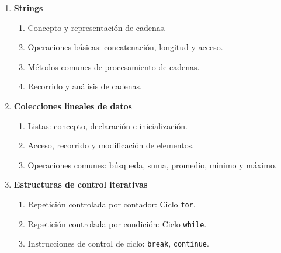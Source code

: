 \begin{enumerate}
  \begin{enumerate}
    \item \label{itm:4.1} Secuencia de instrucciones y bloques de código.
    \item \label{itm:4.2} Evaluación de condiciones lógicas.
    \item \label{itm:4.3} Estructura \texttt{if}.
    \item \label{itm:4.4} Estructura \texttt{if--else}.
    \item \label{itm:4.5} Estructura \texttt{if--elif--else}.
    \item \label{itm:4.6} Condicionales anidados.
  \end{enumerate}

  \item \textbf{Strings}

  \begin{enumerate}
    \item \label{itm:5.1} Concepto y representación de cadenas.
    \item \label{itm:5.2} Operaciones básicas: concatenación, longitud y acceso.
    \item \label{itm:5.3} Métodos comunes de procesamiento de cadenas.
    \item \label{itm:5.4} Recorrido y análisis de cadenas.
  \end{enumerate}

  \item \textbf{Colecciones lineales de datos}

  \begin{enumerate}
    \item \label{itm:6.1} Listas: concepto, declaración e inicialización.
    \item \label{itm:6.2} Acceso, recorrido y modificación de elementos.
    \item \label{itm:6.3} Operaciones comunes: búsqueda, suma, promedio, mínimo y máximo.
  \end{enumerate}

  \item \textbf{Estructuras de control iterativas}

  \begin{enumerate}
    \item \label{itm:7.1} Repetición controlada por contador: Ciclo \texttt{for}.
    \item \label{itm:7.2} Repetición controlada por condición: Ciclo \texttt{while}.
    \item \label{itm:7.3} Instrucciones de control de ciclo: \texttt{break}, \texttt{continue}.
  \end{enumerate}


\end{enumerate}
